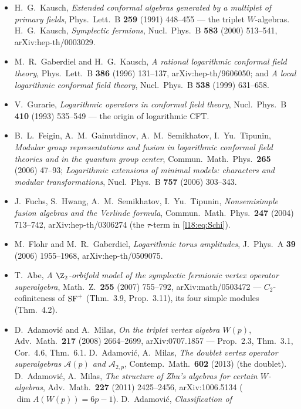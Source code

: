 \begin{itemize}
\item H.~G.~Kausch, \emph{Extended conformal algebras generated by a multiplet of primary fields}, Phys.\ Lett.\ B
  \textbf{259} (1991) 448--455 --- the triplet $W$-algebras. H.~G.~Kausch, \emph{Symplectic fermions}, Nucl.\ Phys.\ B
  \textbf{583} (2000) 513--541, arXiv:hep-th/0003029.
\item M.~R.~Gaberdiel and H.~G.~Kausch, \emph{A rational logarithmic conformal field theory}, Phys.\ Lett.\ B \textbf{386}
  (1996) 131--137, arXiv:hep-th/9606050; and \emph{A local logarithmic conformal field theory}, Nucl.\ Phys.\ B \textbf{538}
  (1999) 631--658.
\item V.~Gurarie, \emph{Logarithmic operators in conformal field theory}, Nucl.\ Phys.\ B \textbf{410} (1993) 535--549 ---
  the origin of logarithmic CFT.
\item B.~L.~Feigin, A.~M.~Gainutdinov, A.~M.~Semikhatov, I.~Yu.~Tipunin, \emph{Modular group representations and fusion in
  logarithmic conformal field theories and in the quantum group center}, Commun.\ Math.\ Phys.\ \textbf{265} (2006) 47--93;
  \emph{Logarithmic extensions of minimal models: characters and modular transformations}, Nucl.\ Phys.\ B \textbf{757}
  (2006) 303--343.
\item J.~Fuchs, S.~Hwang, A.~M.~Semikhatov, I.~Yu.~Tipunin, \emph{Nonsemisimple fusion algebras and the Verlinde formula},
  Commun.\ Math.\ Phys.\ \textbf{247} (2004) 713--742, arXiv:hep-th/0306274 (the $\tau$-term in \eqref{l18:eq:Schi}).
\item M.~Flohr and M.~R.~Gaberdiel, \emph{Logarithmic torus amplitudes}, J.\ Phys.\ A \textbf{39} (2006) 1955--1968,
  arXiv:hep-th/0509075.
\item T.~Abe, \emph{A $\Z_2$-orbifold model of the symplectic fermionic vertex operator superalgebra}, Math.\ Z.\
  \textbf{255} (2007) 755--792, arXiv:math/0503472 --- $C_2$-cofiniteness of $\mathrm{SF}^+$ (Thm.~3.9, Prop.~3.11), its
  four simple modules (Thm.~4.2).
\item D.~Adamovi\'c and A.~Milas, \emph{On the triplet vertex algebra $W(p)$}, Adv.\ Math.\ \textbf{217} (2008)
  2664--2699, arXiv:0707.1857 --- Prop.~2.3, Thm.~3.1, Cor.~4.6, Thm.~6.1. D.~Adamovi\'c, A.~Milas, \emph{The doublet vertex
  operator superalgebras $\mathcal A(p)$ and $\mathcal A_{2,p}$}, Contemp.\ Math.\ \textbf{602} (2013)
  (the doublet). D.~Adamovi\'c, A.~Milas, \emph{The structure of Zhu's algebras for certain $W$-algebras}, Adv.\ Math.\
  \textbf{227} (2011) 2425--2456, arXiv:1006.5134 ($\dim A(W(p))=6p-1$). D.~Adamovi\'c, \emph{Classification of
}
\end{itemize}
